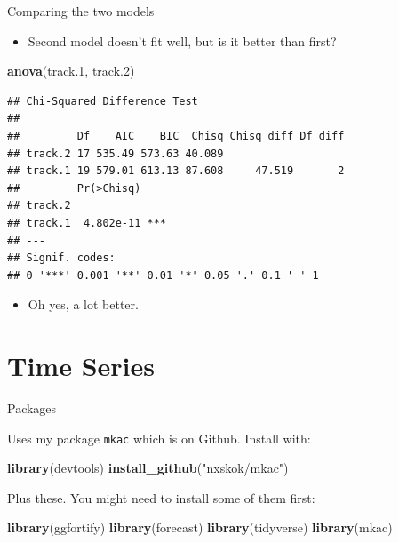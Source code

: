 \documentclass[ignorenonframetext,]{beamer}
\newenvironment{Shaded}{\begin{snugshade}}{\end{snugshade}}
\newcommand{\FloatTok}[1]{\textcolor[rgb]{0.00,0.00,0.81}{#1}}
\newcommand{\KeywordTok}[1]{\textcolor[rgb]{0.13,0.29,0.53}{\textbf{#1}}}
\newcommand{\NormalTok}[1]{#1}
\newcommand{\StringTok}[1]{\textcolor[rgb]{0.31,0.60,0.02}{#1}}
\providecommand{\tightlist}{%
  \setlength{\itemsep}{0pt}\setlength{\parskip}{0pt}}
\begin{document}
\begin{frame}[fragile]{Comparing the two models}
\protect\hypertarget{comparing-the-two-models}{}

\begin{itemize}
\tightlist
\item
  Second model doesn't fit well, but is it better than first?
\end{itemize}

\footnotesize

\begin{Shaded}
\begin{Highlighting}[]
\KeywordTok{anova}\NormalTok{(track}\FloatTok{.1}\NormalTok{, track}\FloatTok{.2}\NormalTok{)}
\end{Highlighting}
\end{Shaded}

\begin{verbatim}
## Chi-Squared Difference Test
## 
##         Df    AIC    BIC  Chisq Chisq diff Df diff
## track.2 17 535.49 573.63 40.089                   
## track.1 19 579.01 613.13 87.608     47.519       2
##         Pr(>Chisq)    
## track.2               
## track.1  4.802e-11 ***
## ---
## Signif. codes:  
## 0 '***' 0.001 '**' 0.01 '*' 0.05 '.' 0.1 ' ' 1
\end{verbatim}

\normalsize

\begin{itemize}
\tightlist
\item
  Oh yes, a lot better.
\end{itemize}

\end{frame}

\hypertarget{time-series}{%
\section{Time Series}\label{time-series}}

\begin{frame}[fragile]{Packages}
\protect\hypertarget{packages-10}{}

Uses my package \texttt{mkac} which is on Github. Install with:

\begin{Shaded}
\begin{Highlighting}[]
\KeywordTok{library}\NormalTok{(devtools)}
\KeywordTok{install_github}\NormalTok{(}\StringTok{"nxskok/mkac"}\NormalTok{)}
\end{Highlighting}
\end{Shaded}

Plus these. You might need to install some of them first:

\begin{Shaded}
\begin{Highlighting}[]
\KeywordTok{library}\NormalTok{(ggfortify)}
\KeywordTok{library}\NormalTok{(forecast)}
\KeywordTok{library}\NormalTok{(tidyverse)}
\KeywordTok{library}\NormalTok{(mkac) }
\end{Highlighting}
\end{Shaded}

\end{frame}
\end{document}
